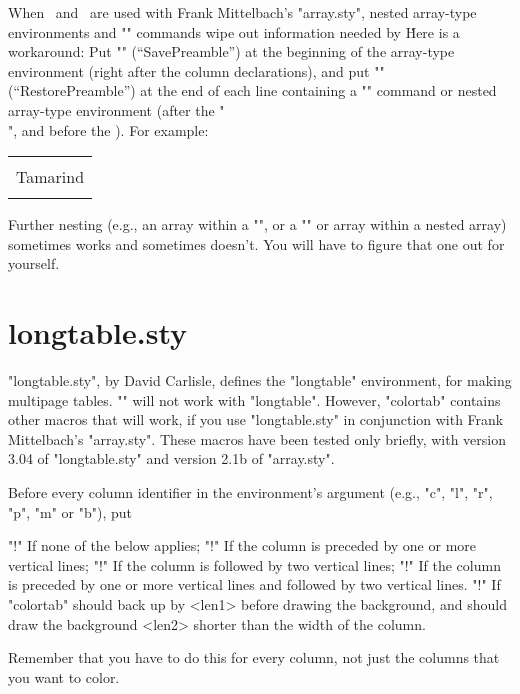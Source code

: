 When \n\LCC\ and \n\ECC\ are used with Frank Mittelbach's "array.sty", nested
array-type environments and "\multicolumn" commands wipe out information
needed by \n\ECC\. Here is a workaround: Put "\SP" (``SavePreamble'') at the
beginning of the array-type environment (right after the column declarations),
and put "\RP" (``RestorePreamble'') at the end of each line containing a
"\multicolumn" command or nested array-type environment (after the "\\", and
before the \n\ECC). For example:
\begin{LVerbatim}
  \begin{tabular}{|l|c|}\SP\hline
    \LCC
      \gray & \\
      \multicolumn{2}{c}{Tamarind}\\ \RP \hline
    \ECC
  \end{tabular}
\end{LVerbatim}
Further nesting (e.g., an array within a "\multicolumn", or a "\multicolumn"
or array within a nested array) sometimes works and sometimes doesn't. You
will have to figure that one out for yourself.


\section{longtable.sty}

"longtable.sty", by David Carlisle, defines the "longtable" environment, for
making multipage tables. "\LCC" will not work with "longtable". However,
"colortab" contains other macros that will work, if you use "longtable.sty" in
conjunction with Frank Mittelbach's "array.sty". These macros have been tested
only briefly, with version 3.04 of "longtable.sty" and version 2.1b of
"array.sty".

Before every column identifier in the environment's argument (e.g., "c", "l",
"r", "p", "m" or "b"), put
\begin{description}
  \vitem"!{\LC}" If none of the below applies;
  \vitem"!{\LCi}" If the column is preceded by one or more vertical lines;
  \vitem"!{\LCii}" If the column is followed by two vertical lines;
  \vitem"!{\LCiii}" If the column is preceded by one or more vertical lines
and followed by two vertical lines.
  \vitem"!{}" If "colortab" should back up by <len1>
before drawing the background, and should draw the background <len2> shorter
than the width of the column.
\end{description}
Remember that you have to do this for every column, not just the columns that
you want to color.

